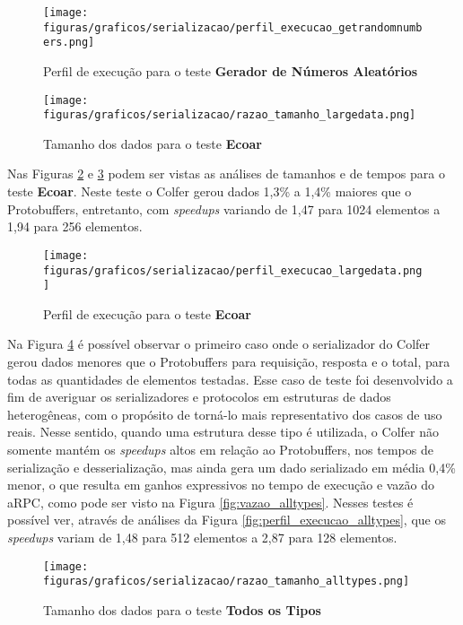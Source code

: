 \begin{figure}[H]
    \centering
    \caption{Perfil de execução para o teste \textbf{Gerador de Números Aleatórios}}
    \texttt{[image: figuras/graficos/serializacao/perfil\_execucao\_getrandomnumbers.png]} 
    \label{fig:perfil_execucao_getrandomnumbers}
\end{figure}

\begin{figure}[ht]
    \centering
    \caption{Tamanho dos dados para o teste \textbf{Ecoar}}
    \texttt{[image: figuras/graficos/serializacao/razao\_tamanho\_largedata.png]} 
    \label{fig:razao_tamanho_largedata}
\end{figure}

Nas Figuras \ref{fig:razao_tamanho_largedata} e \ref{fig:perfil_execucao_largedata} podem ser vistas as análises de tamanhos e de tempos para o teste \textbf{Ecoar}. Neste teste o Colfer gerou dados 1,3\% a 1,4\% maiores que o Protobuffers, entretanto, com \textit{speedups} variando de 1,47 para 1024 elementos a 1,94 para 256 elementos.

\begin{figure}[ht]
    \centering
    \caption{Perfil de execução para o teste \textbf{Ecoar}}
    \texttt{[image: figuras/graficos/serializacao/perfil\_execucao\_largedata.png]} 
    \label{fig:perfil_execucao_largedata}
\end{figure}

Na Figura \ref{fig:razao_tamanho_alltypes} é possível observar o primeiro caso onde o serializador do Colfer gerou dados menores que o Protobuffers para requisição, resposta e o total, para todas as quantidades de elementos testadas. Esse caso de teste foi desenvolvido a fim de averiguar os serializadores e protocolos em estruturas de dados heterogêneas, com o propósito de torná-lo mais representativo dos casos de uso reais. Nesse sentido, quando uma estrutura desse tipo é utilizada, o Colfer não somente mantém os \textit{speedups} altos em relação ao Protobuffers, nos tempos de serialização e desserialização, mas ainda gera um dado serializado em média 0,4\% menor, o que resulta em ganhos expressivos no tempo de execução e vazão do aRPC, como pode ser visto na Figura \ref{fig:vazao_alltypes}. Nesses testes é possível ver, através de análises da Figura \ref{fig:perfil_execucao_alltypes}, que os \textit{speedups} variam de 1,48 para 512 elementos a 2,87 para 128 elementos.

\begin{figure}[ht]
    \centering
    \caption{Tamanho dos dados para o teste \textbf{Todos os Tipos}}
    \texttt{[image: figuras/graficos/serializacao/razao\_tamanho\_alltypes.png]} 
    \label{fig:razao_tamanho_alltypes}
\end{figure}

